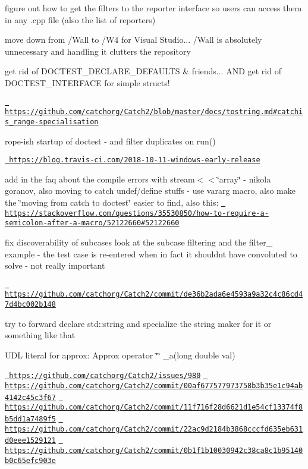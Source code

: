 figure out how to get the filters to the reporter interface so users can access them in any .cpp file (also the list of reporters)

move down from /\+Wall to /\+W4 for Visual Studio... /\+Wall is absolutely unnecessary and handling it clutters the repository

get rid of DOCTEST\+\_\+\+DECLARE\+\_\+\+DEFAULTS \& friends... AND get rid of DOCTEST\+\_\+\+INTERFACE for simple structs!

\href{https://github.com/catchorg/Catch2/blob/master/docs/tostring.md\#catchis_range-specialisation}{\texttt{ https\+://github.\+com/catchorg/\+Catch2/blob/master/docs/tostring.\+md\#catchis\+\_\+range-\/specialisation}}

rope-\/ish startup of doctest -\/ and filter duplicates on run()

\href{https://blog.travis-ci.com/2018-10-11-windows-early-release}{\texttt{ https\+://blog.\+travis-\/ci.\+com/2018-\/10-\/11-\/windows-\/early-\/release}}

add in the faq about the compile errors with stream$<$$<$\char`\"{}array\char`\"{} -\/ nikola goranov, also moving to catch undef/define stuffs -\/ use vararg macro, also make the \char`\"{}moving from catch to doctest\char`\"{} easier to find, also this\+: \href{https://stackoverflow.com/questions/35530850/how-to-require-a-semicolon-after-a-macro/52122660\#52122660}{\texttt{ https\+://stackoverflow.\+com/questions/35530850/how-\/to-\/require-\/a-\/semicolon-\/after-\/a-\/macro/52122660\#52122660}}

fix discoverability of subcases look at the subcase filtering and the filter\+\_ example -\/ the test case is re-\/entered when in fact it shouldn\textquotesingle{}t have convoluted to solve -\/ not really important

\href{https://github.com/catchorg/Catch2/commit/de36b2ada6e4593a9a32c4c86cd47d4bc002b148}{\texttt{ https\+://github.\+com/catchorg/\+Catch2/commit/de36b2ada6e4593a9a32c4c86cd47d4bc002b148}}

try to forward declare std\+::string and specialize the string maker for it or something like that

UDL literal for approx\+: Approx operator \char`\"{}\char`\"{} \+\_\+a(long double val)

\href{https://github.com/catchorg/Catch2/issues/980}{\texttt{ https\+://github.\+com/catchorg/\+Catch2/issues/980}} \href{https://github.com/catchorg/Catch2/commit/00af677577973758b3b35e1c94ab4142c45c3f67}{\texttt{ https\+://github.\+com/catchorg/\+Catch2/commit/00af677577973758b3b35e1c94ab4142c45c3f67}} \href{https://github.com/catchorg/Catch2/commit/11f716f28d6621d1e54cf13374f8b5dd1a7489f5}{\texttt{ https\+://github.\+com/catchorg/\+Catch2/commit/11f716f28d6621d1e54cf13374f8b5dd1a7489f5}} \href{https://github.com/catchorg/Catch2/commit/22ac9d2184b3868cccfd635eb631d0eee1529121}{\texttt{ https\+://github.\+com/catchorg/\+Catch2/commit/22ac9d2184b3868cccfd635eb631d0eee1529121}} \href{https://github.com/catchorg/Catch2/commit/0b1f1b10030942c38ca8c1b95140b0c65efc903e}{\texttt{ https\+://github.\+com/catchorg/\+Catch2/commit/0b1f1b10030942c38ca8c1b95140b0c65efc903e}}

